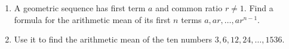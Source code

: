\begin{enumerate}
\item[(a)] A geometric sequence has first term $a$ and common ratio $r\ne1$. Find a formula for the arithmetic mean of its first $n$ terms $a,ar,\ldots,ar^{n-1}$.
\item[(b)] Use it to find the arithmetic mean of the ten numbers $3,6,12,24,\ldots,1536$.
\end{enumerate}
